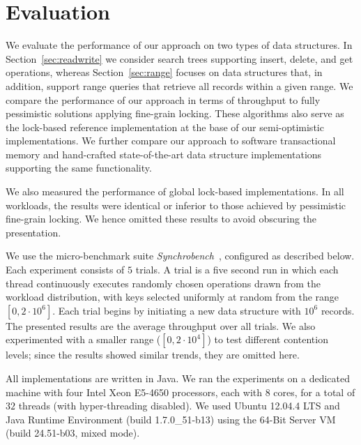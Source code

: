 \section{Evaluation}
\label{sec:eval}

We evaluate the performance of our approach on two types of data
structures. In Section~\ref{sec:readwrite} we consider search trees
supporting insert, delete, and get operations, whereas Section~\ref{sec:range}
focuses on data structures that, in addition, support range queries that retrieve all
records within a given range. We compare the performance of our approach in terms of
throughput to fully pessimistic solutions applying fine-grain locking. These
algorithms also serve as the lock-based reference implementation at the base of
our semi-optimistic implementations.
We further
compare our approach to software transactional memory and hand-crafted state-of-the-art data structure
implementations supporting the same functionality.

We also measured the performance of global lock-based implementations.
In all workloads, the results were identical or inferior to those
achieved by pessimistic fine-grain locking. We hence
omitted these results to avoid obscuring the presentation.

We use the micro-benchmark suite \textit{Synchrobench}~\cite{Gramoli2015}, configured as described below. 
Each experiment
consists of $5$ trials. A trial is a five second run in which each thread continuously executes
randomly chosen operations drawn from the workload distribution, with keys
selected uniformly at random from the range $[0,2\cdot10^6]$.
Each trial begins by initiating a new data structure with
$10^6$ records. The presented results are the average throughput over all trials.
We also experimented with a smaller range ($[0,2\cdot10^4]$) to test different
contention levels; since the results showed similar trends, they are omitted here.

All implementations are written in Java. We ran the experiments on a dedicated machine with
four Intel Xeon E5-4650 processors, each with $8$ cores, for a total of $32$ threads
(with hyper-threading disabled).
We used Ubuntu 12.04.4 LTS and Java Runtime Environment (build
1.7.0\_51-b13) using the 64-Bit Server VM (build 24.51-b03, mixed mode).


